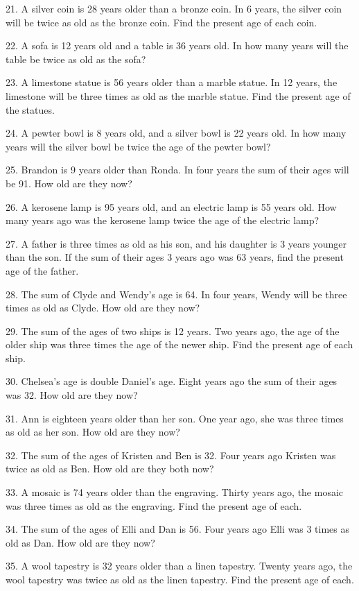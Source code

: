 \documentclass[11pt]{book}
\theoremstyle{definition}  %
\begin{document}
21. A silver coin is 28 years older than a bronze coin. In 6 years, the silver
coin will be twice as old as the bronze coin. Find the
present age of each coin.

22. A sofa is 12 years old and a table is 36 years old. In how many years will
the table be twice as old as the sofa?

23. A limestone statue is 56 years older than a marble statue. In 12 years,
the limestone will be three times as old as the marble
statue. Find the present age of the statues.

24. A pewter bowl is 8 years old, and a silver bowl is 22 years old. In how
many years will the silver bowl be twice the age of the pewter
bowl?

25. Brandon is 9 years older than Ronda. In four years the sum of their ages
will be 91. How old are they now?

26. A kerosene lamp is 95 years old, and an electric lamp is 55 years old. How
many years ago was the kerosene lamp twice the age of the
electric lamp?

27. A father is three times as old as his son, and his daughter is 3 years
younger than the son. If the sum of their ages 3 years ago
was 63 years, find the present age of the father.

28. The sum of Clyde and Wendy's age is 64. In four years, Wendy will be three
times as old as Clyde. How old are they now?

29. The sum of the ages of two ships is 12 years. Two years ago, the age of
the older ship was three times the age of the newer ship.
Find the present age of each ship.

30. Chelsea's age is double Daniel's age. Eight years ago the sum of their
ages was 32. How old are they now?

31. Ann is eighteen years older than her son. One year ago, she was three
times as old as her son. How old are they now?

32. The sum of the ages of Kristen and Ben is 32. Four years ago Kristen was twice as old as Ben. How old are they both now?

33. A mosaic is 74 years older than the engraving. Thirty years ago, the
mosaic was three times as old as the engraving. Find the
present age of each.

34. The sum of the ages of Elli and Dan is 56. Four years ago Elli was 3 times
as old as Dan. How old are they now?

35. A wool tapestry is 32 years older than a linen tapestry. Twenty years ago,
the wool tapestry was twice as old as the linen tapestry. Find the
present age of each.
\end{document}
